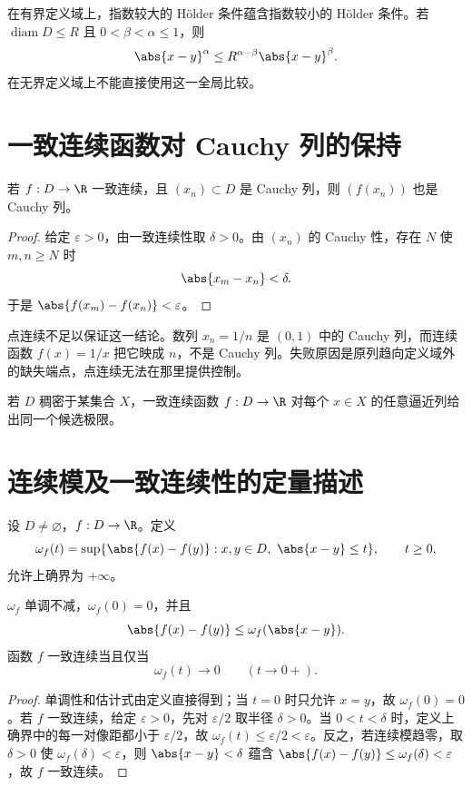 \begin{remark}
在有界定义域上，指数较大的 Hölder 条件蕴含指数较小的 Hölder 条件。若 \(\operatorname{diam}D\le R\) 且 \(0<\beta<\alpha\le1\)，则
\[
 \abs{x-y}^{\alpha}
 \le R^{\alpha-\beta}\abs{x-y}^{\beta}.
\]
在无界定义域上不能直接使用这一全局比较。
\end{remark}

\section{一致连续函数对 Cauchy 列的保持}

\begin{theorem}
若 \(f:D\to\R\) 一致连续，且 \((x_n)\subset D\) 是 Cauchy 列，则 \((f(x_n))\) 也是 Cauchy 列。
\end{theorem}

\begin{proof}
给定 \(\varepsilon>0\)，由一致连续性取 \(\delta>0\)。由 \((x_n)\) 的 Cauchy 性，存在 \(N\) 使 \(m,n\ge N\) 时
\[
 \abs{x_m-x_n}<\delta.
\]
于是 \(\abs{f(x_m)-f(x_n)}<\varepsilon\)。
\end{proof}

点连续不足以保证这一结论。数列 \(x_n=1/n\) 是 \((0,1)\) 中的 Cauchy 列，而连续函数 \(f(x)=1/x\) 把它映成 \(n\)，不是 Cauchy 列。失败原因是原列趋向定义域外的缺失端点，点连续无法在那里提供控制。

\begin{corollary}
若 \(D\) 稠密于某集合 \(X\)，一致连续函数 \(f:D\to\R\) 对每个 \(x\in X\) 的任意逼近列给出同一个候选极限。
\end{corollary}

\section{连续模及一致连续性的定量描述}

\begin{definition}[连续模]
设 \(D\ne\varnothing\)，\(f:D\to\R\)。定义
\[
 \omega_f(t)=
 \sup\{\abs{f(x)-f(y)}:x,y\in D,\ \abs{x-y}\le t\},
 \qquad t\ge0,
\]
允许上确界为 \(+\infty\)。
\end{definition}

\begin{proposition}
\(\omega_f\) 单调不减，\(\omega_f(0)=0\)，并且
\[
 \abs{f(x)-f(y)}\le\omega_f(\abs{x-y}).
\]
函数 \(f\) 一致连续当且仅当
\[
 \omega_f(t)\longrightarrow0\qquad(t\to0+).
\]
\end{proposition}

\begin{proof}
单调性和估计式由定义直接得到；当 \(t=0\) 时只允许 \(x=y\)，故 \(\omega_f(0)=0\)。若 \(f\) 一致连续，给定 \(\varepsilon>0\)，先对 \(\varepsilon/2\) 取半径 \(\delta>0\)。当 \(0<t<\delta\) 时，定义上确界中的每一对像距都小于 \(\varepsilon/2\)，故 \(\omega_f(t)\le\varepsilon/2<\varepsilon\)。反之，若连续模趋零，取 \(\delta>0\) 使 \(\omega_f(\delta)<\varepsilon\)，则 \(\abs{x-y}<\delta\) 蕴含 \(\abs{f(x)-f(y)}\le\omega_f(\delta)<\varepsilon\)，故 \(f\) 一致连续。
\end{proof}


